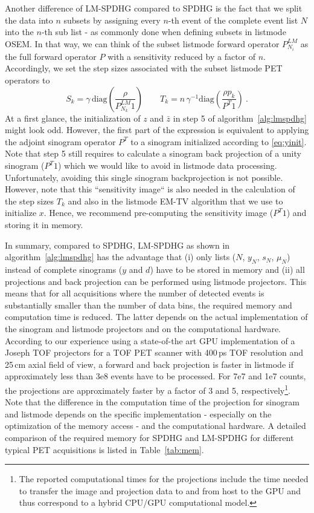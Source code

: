 Another difference of LM-SPDHG compared to SPDHG is the fact that we split the data into $n$ subsets by
assigning every $n$-th event of the complete event list $N$ into the $n$-th sub list - 
as commonly done when defining subsets in listmode OSEM.
In that way, we can think of the subset listmode forward operator $P^{LM}_{N_i}$
as the full forward operator $P$ with a sensitivity reduced by a factor of $n$.
Accordingly, we set the step sizes associated with the subset listmode PET operators to
%
\begin{equation}
S_k = \gamma \, \text{diag}(\frac{\rho}{P^{LM}_{N_k} 1} )\qquad  T_k = n\,\gamma^{-1} \text{diag}(\frac{\rho p_k}{P^T 1}) \ . 
\label{eq:lm_stepsizes}
\end{equation}
% 
At a first glance, the initialization of $z$ and $\bar{z}$ in step 5 of algorithm~\ref{alg:lmspdhg} 
might look odd.
However, the first part of the expression is equivalent to 
applying the adjoint sinogram operator $P^T$ to a sinogram initialized according to \eqref{eq:yinit}.
Note that step 5 still requires to calculate a sinogram back projection of a unity sinogram ($P^T 1$)
which we would like to avoid in listmode data processing.
Unfortunately, avoiding this single sinogram backprojection is not possible.
However, note that this ``sensitivity image`` is also needed in the calculation of the step sizes
$T_k$ and also in the listmode EM-TV algorithm that we use to initialize $x$.
Hence, we recommend pre-computing the sensitivity image ($P^T 1$) and storing it in memory.

In summary, compared to SPDHG, LM-SPDHG as shown in algorithm~\ref{alg:lmspdhg} has the advantage
that (i) only lists ($N$, $y_{N}$, $s_N$, $\mu_N$) instead of complete sinograms 
($y$ and $d$) have to be 
stored in memory and (ii) all projections and back projection can be performed using listmode
projectors.
This means that for all acquisitions where the number of detected events is substantially smaller than
the number of data bins, the required memory and computation time is reduced.
The latter depends on the actual implementation of the sinogram and listmode projectors
and on the computational hardware.
According to our experience using a state-of-the art GPU implementation of a Joseph TOF projectors
for a TOF PET scanner with 400\,ps TOF resolution and 25\,cm axial field of view,
a forward and back projection is faster in listmode if approximately less than 3e8 events 
have to be processed.
For 7e7 and 1e7 counts, the projections are approximately faster by a factor of 3 and 5,
respectively\footnote{The reported computational times for the projections include the time
needed to transfer the image and projection data to and from host to the GPU and thus
correspond to a hybrid CPU/GPU computational model.}.
Note that the difference in the computation time of the projection for sinogram and listmode 
depends on the specific implementation - especially on the optimization of the memory access - 
and the computational hardware.
A detailed comparison of the required memory for SPDHG and LM-SPDHG for different typical PET
acquisitions is listed in Table~\ref{tab:mem}.

